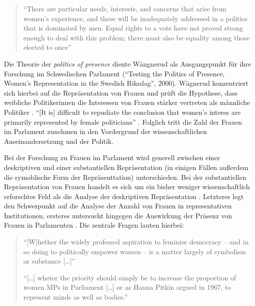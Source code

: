 \documentclass[12pt, 
    twoside=false, 
    bibliography=totoc, 
    numbers=endperiod, 
    headings=normal, 
    toc=chapterentrydotfill
    ]{scrbook}
\begin{document}
\begin{quote}
    \enquote{There are particular needs, interests, and concerns that arise from women's experience, and these will be inadequately addressed in a politics that is dominated by men. Equal rights to a vote have not proved strong enough to deal with this problem; there must also be equality among those elected to once} \parencite[66]{phillips_1998}
\end{quote}

Die Theorie der \emph{politics of presence} \parencite{phillips_1998} diente Wängnerud \parencite*{wangnerud_2000} als Ausgangspunkt für ihre Forschung im Schwedischen Parlament (\enquote{Testing the Politics of Presence, Women's Representation in the Swedish Riksdag}, 2000). Wägnerud konzentriert sich hierbei auf die Repräsentation von Frauen und prüft die Hypothese, dass weibliche Politikerinnen die Interessen von Frauen stärker vertreten als männliche Politiker \parencite[84]{wangnerud_2000}. \enquote{[It is] difficult to repudiate the conclusion that women's interes are primarily represented by female politicians} \parencite[][84]{wangnerud_2000}.
Folglich tritt die Zahl der Frauen im Parlament zunehmen in den Vordergrund der wissenschaftlichen Auseinandersetzung und der Politik. 

Bei der Forschung zu Frauen im Parlament wird generell zwischen einer deskriptiven und einer substantiellen Repräsentation (in einigen Fällen außerdem die symoblische Form der Repräsenttation) unterschieden. Bei der substantiellen Repräsentation von Frauen handelt es sich um ein bisher weniger wissenschaftlich erforschtes Feld als die Analyse der deskriptiven Repräsentation \parencite[59]{wangnerud_2009}. Letzteres legt den Schwerpunkt auf die Analyse der Anzahl von Frauen in representativen Institutionen, ersteres untersucht hingegen die Auswirkung der Präsenz von Frauen in Parlamenten \parencites[14]{coffe_2013}[52]{wangnerud_2009}.
Die zentrale Fragen lauten hierbei:


\begin{quote}
  \enquote{[W]hether the widely professed aspiration to feminise democracy -- and in so doing to politically empower women -- is a matter largely of symbolism or substance […]}
  
  
  \enquote{[…] wheter the priority should simply be to increase the proportion of women MPs in Parliament […] or as Hanna Pitkin argued in 1967, to represent minds as well as bodies.}
  \parencite[413]{blaxill_2016}
\end{quote}
\end{document}
